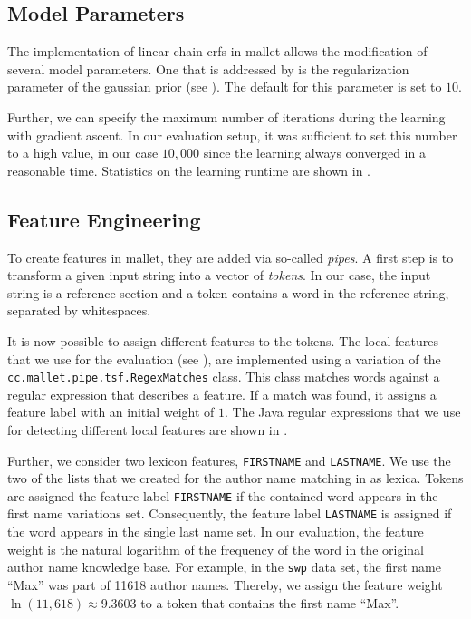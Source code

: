 \subsection{Model Parameters}\label{subsec:i-model-parameters}

The implementation of \glspl{linear-chain crf} in \gls{mallet} allows the modification of several model parameters.
One that is addressed by  is the regularization parameter of the \gls{gaussian prior} (see ).
The default for this parameter is set to $10$.

Further, we can specify the maximum number of iterations during the learning with gradient ascent.
In our evaluation setup, it was sufficient to set this number to a high value, in our case $10,000$ since the learning always converged in a reasonable time.
Statistics on the learning runtime are shown in .

\subsection{Feature Engineering}\label{subsec:i-feature-engineering}

To create features in \gls{mallet}, they are added via so-called \textit{pipes}.
A first step is to transform a given input string into a vector of \textit{tokens}.
In our case, the input string is a reference section and a token contains a word in the reference string, separated by whitespaces.

It is now possible to assign different features to the tokens.
The local features that we use for the evaluation (see ), are implemented using a variation of the \texttt{cc.mallet.pipe.tsf.RegexMatches} class.
This class matches words against a regular expression that describes a feature.
If a match was found, it assigns a feature label with an initial weight of $1$.
The Java regular expressions that we use for detecting different local features are shown in .

Further, we consider two lexicon features, \texttt{FIRSTNAME} and \texttt{LASTNAME}.
We use the two of the lists that we created for the author name matching in  as lexica.
Tokens are assigned the feature label \texttt{FIRSTNAME} if the contained word appears in the first name variations set.
  Consequently, the feature label \texttt{LASTNAME} is assigned if the word appears in the single last name set.
In our evaluation, the feature weight is the natural logarithm of the frequency of the word in the original author name knowledge base.
For example, in the \texttt{swp} data set, the first name ``Max'' was part of \num{11618} author names.
Thereby, we assign the feature weight $\ln(11,618)\approx9.3603$ to a token that contains the first name ``Max''.

